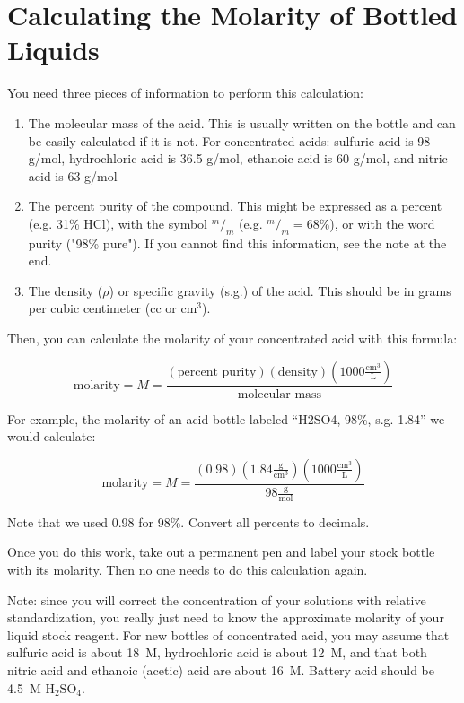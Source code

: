 \chapter{Calculating the Molarity of Bottled Liquids} 
\label{cha:mol-bottle-liq}

You need three pieces of information to perform this calculation:

\begin{enumerate}

\item{The molecular mass of the acid. This is usually written on the bottle and can be easily calculated if it is not. For concentrated acids: sulfuric acid is 98 g/mol, hydrochloric acid is 36.5 g/mol, ethanoic acid is 60 g/mol, and nitric acid is 63 g/mol}

\item{The percent purity of the compound. This might be expressed as a percent (e.g. 31\% HCl), with the symbol $ ^m/_m $ (e.g. $ ^m/_m = 68\% $), or with the word purity ("98\% pure"). If you cannot find this information, see the note at the end.}

\item{The density ($\rho$) or specific gravity (s.g.) of the acid. This should be in grams per cubic centimeter (cc or $\mathrm{cm}^3$).}

\end{enumerate}

Then, you can calculate the molarity of your concentrated acid with this formula:

\[ \mathrm{molarity} = M = \frac{ ( \mathrm{ \text{percent purity} } )( \mathrm{density} )( 1000 \frac{ \mathrm{cm^3} }{ \text{L} } )}{ \mathrm{\text{molecular mass}} } \]

For example, the molarity of an acid bottle labeled “H2SO4, 98\%, s.g. 1.84” we would calculate:

\[ \mathrm{molarity} = M = \frac{ (0.98)(1.84 \frac{ \mathrm{g} }{ \mathrm{cm^3} })( 1000 \frac{ \mathrm{cm^3} }{ \mathrm{L} } ) }{ 98 \frac{ \mathrm{g} }{ \mathrm{mol} } } \]

Note that we used 0.98 for 98\%. Convert all percents to decimals.

Once you do this work, take out a permanent pen and label your stock bottle with its molarity. Then no one needs to do this calculation again.

Note: since you will correct the concentration of your solutions with relative standardization, you really just need to know the approximate molarity of your liquid stock reagent. For new bottles of concentrated acid, you may assume that sulfuric acid is about 18~M, hydrochloric acid is about 12~M, and that both nitric acid and ethanoic (acetic) acid are about 16~M. Battery acid should be 4.5~M $ \mathrm{H}_2 \mathrm{SO}_4 $.
